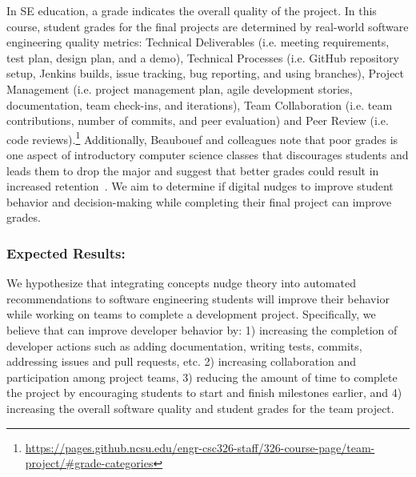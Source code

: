In SE education, a grade indicates the overall quality of the project. In this course, student grades for the final projects are determined by real-world software engineering quality metrics: Technical Deliverables (i.e. meeting requirements, test plan, design plan, and a demo), Technical Processes (i.e. GitHub repository setup, Jenkins builds, issue tracking, bug reporting, and using branches), Project Management (i.e. project management plan, agile development stories, documentation, team check-ins, and iterations), Team Collaboration (i.e. team contributions, number of commits, and peer evaluation) and Peer Review (i.e. code reviews).\footnote{\url{https://pages.github.ncsu.edu/engr-csc326-staff/326-course-page/team-project/#grade-categories}} Additionally, Beaubouef and colleagues note that poor grades is one aspect of introductory computer science classes that discourages students and leads them to drop the major and suggest that better grades could result in increased retention~\cite{beaubouef2005high}. We aim to determine if digital nudges to improve student behavior and decision-making while completing their final project can improve grades.

\subsubsection{Expected Results:}

We hypothesize that integrating concepts nudge theory into automated recommendations to software engineering students will improve their behavior while working on teams to complete a development project. Specifically, we believe that \TOOL can improve developer behavior by: 1) increasing the completion of developer actions such as adding documentation, writing tests, commits, addressing issues and pull requests, etc. 2) increasing collaboration and participation among project teams, 3) reducing the amount of time to complete the project by encouraging students to start and finish milestones earlier, and 4) increasing the overall software quality and student grades for the team project.
